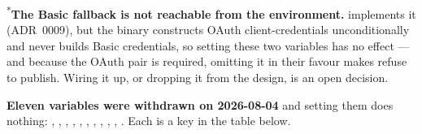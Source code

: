 \footnotesize\textsuperscript{*}\textbf{The Basic fallback is not reachable from the
environment.}  implements it (ADR~0009), but the binary constructs
OAuth client-credentials unconditionally and never builds Basic credentials, so setting
these two variables has no effect --- and because the OAuth pair is required, omitting it in
their favour makes \prog refuse to publish. Wiring it up, or dropping it from the design, is an
open decision.\normalsize

\begin{warning}
\textbf{Eleven variables were withdrawn on 2026-08-04} and setting them does nothing:
, , ,
, , ,
, , ,
, . Each is a key in the table below.
\end{warning}

\section{}

